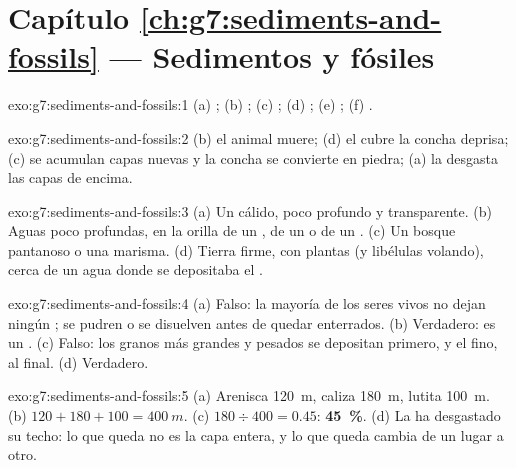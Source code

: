 \section*{Capítulo \ref{ch:g7:sediments-and-fossils} --- Sedimentos y fósiles}

\begin{solution}{exo:g7:sediments-and-fossils:1}
(a) ; (b) ; (c) ; (d) ; (e) ;
(f) .
\end{solution}

\begin{solution}{exo:g7:sediments-and-fossils:2}
(b) el animal muere; (d) el  cubre la concha deprisa; (c) se acumulan
capas nuevas y la concha se convierte en piedra; (a) la  desgasta
las capas de encima.
\end{solution}

\begin{solution}{exo:g7:sediments-and-fossils:3}
(a) Un  cálido, poco profundo y transparente. (b) Aguas poco profundas,
en la orilla de un , de un  o de un . (c) Un bosque pantanoso o
una marisma. (d) Tierra firme, con plantas (y libélulas volando), cerca de
un agua donde se depositaba el .
\end{solution}

\begin{solution}{exo:g7:sediments-and-fossils:4}
(a) Falso: la mayoría de los seres vivos no dejan ningún ; se pudren
o se disuelven antes de quedar enterrados. (b) Verdadero: es un .
(c) Falso: los granos más grandes y pesados se depositan primero, y el
 fino, al final. (d) Verdadero.
\end{solution}

\begin{solution}{exo:g7:sediments-and-fossils:5}
(a) Arenisca \qty{120}{m}, caliza \qty{180}{m}, lutita \qty{100}{m}.
(b) $120 + 180 + 100 = \qty{400}{m}$. (c) $180 \div 400 = 0.45$:
\textbf{45~\%}. (d) La  ha desgastado su techo: lo que queda no es
la capa entera, y lo que queda cambia de un lugar a otro.
\end{solution}

